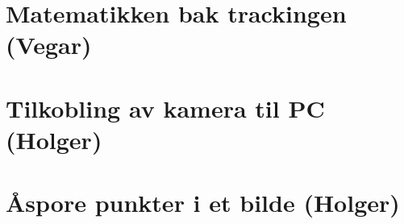 \section{Matematikken bak trackingen (Vegar)}

	

\section{Tilkobling av kamera til PC (Holger)}

	

\section{\AA \space spore punkter i et bilde (Holger)}

	